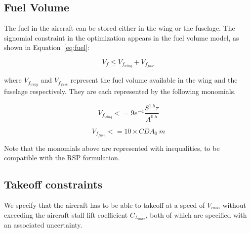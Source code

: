 \subsection{Fuel Volume}
The fuel in the aircraft can be stored either in the wing or the fuselage.
The signomial constraint in the optimization appears in the fuel volume model, as shown in Equation~\ref{eq:fuel}:

\begin{equation}
\label{eq:fuel}
V_f \leq V_{f_{wing}} + V_{f_{fuse}} 
\end{equation}

where $V_{f_{wing}}$ and $V_{f_{fuse}}$ represent the fuel volume available in the wing
and the fuselage respectively. They are each represented by the following monomials.

\begin{equation}
\label{eq:fuelwing}
V_{f_{wing}} <= 9e^{-4}\frac{S^{1.5}\tau}{A^{0.5}}
\end{equation}

\begin{equation}
\label{eq:fuelfuse}
V_{f_{fuse}} <= 10 \times CDA_0~m
\end{equation}

Note that the monomials above are represented with inequalities, to be compatible with the RSP formulation. 

\subsection{Takeoff constraints}
We specify that the aircraft has to be able to takeoff at a speed of $V_{min}$
without exceeding the aircraft stall lift coefficient $C_{L_{max}}$, both of which are
specified with an associated uncertainty.
